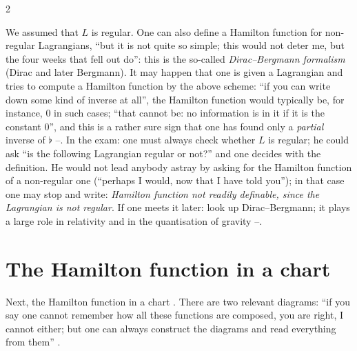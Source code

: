 \begin{paracol}{2}
\begin{remark}\label{rem:hq-dirac}
We assumed that $L$ is regular. One can also define a Hamilton function for non-regular Lagrangians, ``but it is not quite so simple; this would not deter me, but the four weeks that fell out do'': this is the so-called \emph{Dirac--Bergmann formalism} (Dirac and later Bergmann). It may happen that one is given a Lagrangian and tries to compute a Hamilton function by the above scheme: ``if you can write down some kind of inverse at all'', the Hamilton function would typically be, for instance, $0$ in such cases; ``that cannot be: no information is in it if it is the constant $0$'', and this is a rather sure sign that one has found only a \emph{partial} inverse of $\flat$ --.
In the exam: one must always check whether $L$ is regular; he could ask ``is the following Lagrangian regular or not?'' and one decides with the definition. He would not lead anybody astray by asking for the Hamilton function of a non-regular one (``perhaps I would, now that I have told you''); in that case one may stop and write: \emph{Hamilton function not readily definable, since the Lagrangian is not regular}. If one meets it later: look up Dirac--Bergmann; it plays a large role in relativity and in the quantisation of gravity --.
\end{remark}

\section{The Hamilton function in a chart}\label{sec:hq-chart}

Next, the Hamilton function in a chart . There are two relevant diagrams: ``if you say one cannot remember how all these functions are composed, you are right, I cannot either; but one can always construct the diagrams and read everything from them'' .

\begin{nfigure}
\caption*{The two diagrams of the lecture, drawn together. Both charts $\xi_z$ and $\xi^*_z$ come from the same chart $z$ of $\mathcal Z$ (lower right: the chart expression $H_z:=H_L\circ(\xi^*_z)^{-1}$).}
\end{nfigure}


\end{paracol}
